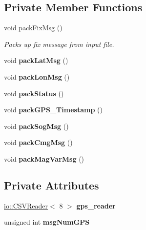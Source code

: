 \subsection*{Private Member Functions}
\begin{DoxyCompactItemize}
\item 
void \hyperlink{classGPS__reader_a548d1980ea97af075804d34638af3a26}{pack\+Fix\+Msg} ()
\begin{DoxyCompactList}\small\item\em Packs up fix message from input file. \end{DoxyCompactList}\item 
\mbox{\label{classGPS__reader_ad88607d8d71d056ade5dc69dc02fced3}} 
void {\bfseries pack\+Lat\+Msg} ()
\item 
\mbox{\label{classGPS__reader_a452eaf0edee31f3feb2b958e9310aff3}} 
void {\bfseries pack\+Lon\+Msg} ()
\item 
\mbox{\label{classGPS__reader_a67385f5ba46b5d866a36d1b0b63d4e23}} 
void {\bfseries pack\+Status} ()
\item 
\mbox{\label{classGPS__reader_a057566cd28481e2b265da7c7bc5094f4}} 
void {\bfseries pack\+G\+P\+S\+\_\+\+Timestamp} ()
\item 
\mbox{\label{classGPS__reader_a4d3cd1b5b65b45bdc873063903ac5ee6}} 
void {\bfseries pack\+Sog\+Msg} ()
\item 
\mbox{\label{classGPS__reader_ac0aad343dff364ccc5acff3a8f1951d0}} 
void {\bfseries pack\+Cmg\+Msg} ()
\item 
\mbox{\label{classGPS__reader_ac682fedffe40ef0f86c574e065a81910}} 
void {\bfseries pack\+Mag\+Var\+Msg} ()
\end{DoxyCompactItemize}
\subsection*{Private Attributes}
\begin{DoxyCompactItemize}
\item 
\mbox{\label{classGPS__reader_a83dc8c11a68339ff3c14ec1f4cc14d50}} 
\hyperlink{classio_1_1CSVReader}{io\+::\+C\+S\+V\+Reader}$<$ 8 $>$ {\bfseries gps\+\_\+reader}
\item 
\mbox{\label{classGPS__reader_a11c923e2668986841cdb75976f8b4c8a}} 
unsigned int {\bfseries msg\+Num\+G\+PS}
\end{DoxyCompactItemize}


